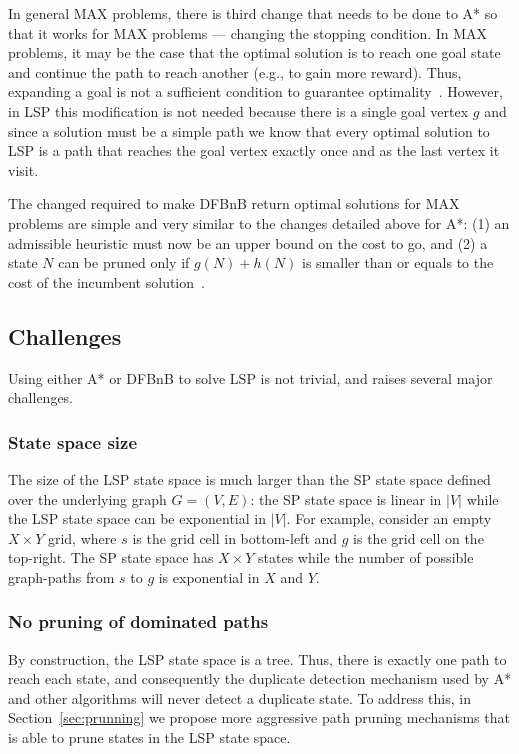 \documentclass[letterpaper]{article} %
\begin{document}
In general MAX problems, there is third change that needs to be done to A* so that it works for MAX problems --- changing the stopping condition. In MAX problems, it may be the case that the optimal solution is to reach one goal state and continue the path to reach another (e.g., to gain more reward). Thus, expanding a goal is not a sufficient condition to guarantee optimality~\cite{DBLP:conf/socs/SternKPFR14}. However, in LSP this modification is not needed because there is a single goal vertex $g$ and since a solution must be a simple path we know that every optimal solution to LSP is a path that reaches the goal vertex exactly once and as the last vertex it visit. 


The changed required to make DFBnB return optimal solutions for MAX problems are simple and very similar to the changes detailed above for A*: 
(1) an admissible heuristic must now be an upper bound on the cost to go, and (2) a state $N$ can be pruned only if $g(N)+h(N)$ is smaller than or equals to the cost of the incumbent solution~\cite{DBLP:conf/socs/SternKPFR14}. 


\subsection{Challenges}
Using either A* or DFBnB to solve LSP is not trivial, and raises several major challenges. 
\subsubsection{State space size} 
The size of the LSP state space is much larger than the SP state space defined over the underlying graph $G=(V,E)$: the SP state space is linear in $|V|$ while the LSP state space can be exponential in $|V|$. 
For example, consider an empty $X\times Y$ grid, where $s$ is the grid cell in bottom-left and $g$ is the grid cell on the top-right. 
The SP state space has $X\times Y$ states while the number of possible graph-paths from $s$ to $g$ is exponential in $X$ and $Y$.

    
\subsubsection{No pruning of dominated paths}
By construction, the LSP state space is a tree. Thus, there is exactly one path to reach each state, and consequently the duplicate detection mechanism used by A* and other algorithms will never detect a duplicate state. To address this, in Section~\ref{sec:prunning} we propose more aggressive path pruning mechanisms that is able to prune states in the LSP state space. 
\end{document}
